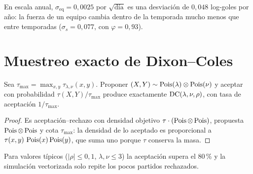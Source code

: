 En escala anual, $\sigma_\text{eq}=0{,}0025$ por $\sqrt{\text{día}}$ es una desviación de $0{,}048$ log-goles por año: la fuerza de un equipo cambia dentro de la temporada mucho menos que entre temporadas ($\sigma_s=0{,}077$, con $\varphi=0{,}93$).

\section{Muestreo exacto de Dixon–Coles}

\begin{proposicion} \dem
Sea $\tau_{\max}=\max_{x,y}\tau_{\lambda,\nu}(x,y)$. Proponer $(X,Y)\sim\operatorname{Pois}(\lambda)\otimes\operatorname{Pois}(\nu)$ y aceptar con probabilidad $\tau(X,Y)/\tau_{\max}$ produce exactamente $\operatorname{DC}(\lambda,\nu,\rho)$, con tasa de aceptación $1/\tau_{\max}$.
\end{proposicion}

\begin{proof}
Es aceptación–rechazo con densidad objetivo $\tau\cdot(\operatorname{Pois}\otimes\operatorname{Pois})$, propuesta $\operatorname{Pois}\otimes\operatorname{Pois}$ y cota $\tau_{\max}$: la densidad de lo aceptado es proporcional a $\tau(x,y)\,\operatorname{Pois}(x)\operatorname{Pois}(y)$, que suma uno porque $\tau$ conserva la masa.
\end{proof}

Para valores típicos ($|\rho|\le0{,}1$, $\lambda,\nu\le3$) la aceptación supera el 80\,\% y la simulación vectorizada solo repite los pocos partidos rechazados.
